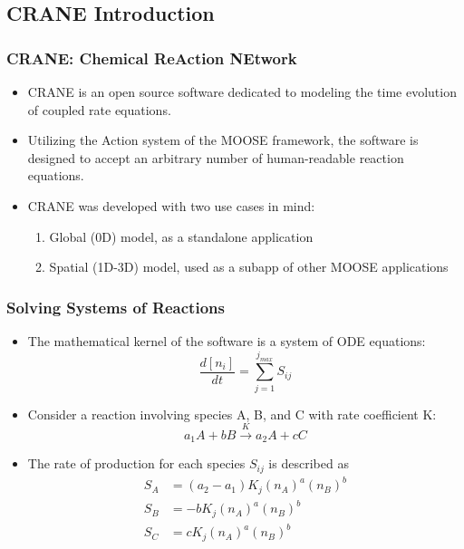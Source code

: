 
	\subsection{CRANE Introduction}
	\begin{frame}[shrink=5]
		\frametitle{CRANE: \textbf{C}hemical \textbf{R}e\textbf{A}ction \textbf{NE}twork}
		\begin{itemize}
			\item CRANE is an open source software dedicated to modeling the time evolution of coupled rate equations.
			\item Utilizing the Action system of the MOOSE framework, the software is designed to accept an arbitrary number of human-readable reaction equations.
			\item CRANE was developed with two use cases in mind:
			\begin{enumerate}
				\item Global (0D) model, as a standalone application
				\item Spatial (1D-3D) model, used as a subapp of other MOOSE applications
			\end{enumerate}
		\end{itemize}
	\end{frame}

	\begin{frame}[shrink=5]
		\frametitle{Solving Systems of Reactions}
		\begin{itemize}
			\item The mathematical kernel of the software is a system of ODE equations:
			\begin{equation}
				\frac{d [n_i]}{dt} = \sum_{j=1}^{j_{max}} S_{ij}
			\end{equation}
			\item Consider a reaction involving species A, B, and C with rate coefficient K:
			\begin{equation}
				a_1A + bB \xrightarrow{K} a_2A + cC
			\end{equation}
			\item The rate of production for each species $S_{ij}$ is described as
			\begin{align}
				S_A &= (a_2 - a_1)K_j (n_A)^a (n_B)^b \\
				S_B &= -b K_j (n_A)^a (n_B)^b \\
				S_C &= c K_j (n_A)^a (n_B)^b
			\end{align}
		\end{itemize}
	\end{frame}
